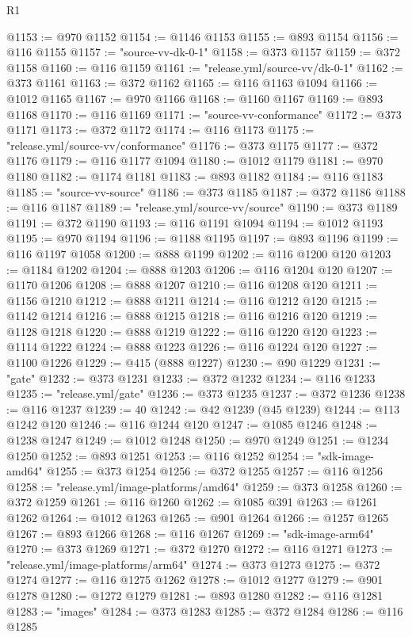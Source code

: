 \begin{lexlean}{R1}
\begin{coremodule}
@1153 := @970 @1152
@1154 := @1146 @1153
@1155 := @893 @1154
@1156 := @116 @1155
@1157 := "source-vv-dk-0-1"
@1158 := @373 @1157
@1159 := @372 @1158
@1160 := @116 @1159
@1161 := "release.yml/source-vv/dk-0-1"
@1162 := @373 @1161
@1163 := @372 @1162
@1165 := @116 @1163 @1094
@1166 := @1012 @1165
@1167 := @970 @1166
@1168 := @1160 @1167
@1169 := @893 @1168
@1170 := @116 @1169
@1171 := "source-vv-conformance"
@1172 := @373 @1171
@1173 := @372 @1172
@1174 := @116 @1173
@1175 := "release.yml/source-vv/conformance"
@1176 := @373 @1175
@1177 := @372 @1176
@1179 := @116 @1177 @1094
@1180 := @1012 @1179
@1181 := @970 @1180
@1182 := @1174 @1181
@1183 := @893 @1182
@1184 := @116 @1183
@1185 := "source-vv-source"
@1186 := @373 @1185
@1187 := @372 @1186
@1188 := @116 @1187
@1189 := "release.yml/source-vv/source"
@1190 := @373 @1189
@1191 := @372 @1190
@1193 := @116 @1191 @1094
@1194 := @1012 @1193
@1195 := @970 @1194
@1196 := @1188 @1195
@1197 := @893 @1196
@1199 := @116 @1197 @1058
@1200 := @888 @1199
@1202 := @116 @1200 @120
@1203 := @1184 @1202
@1204 := @888 @1203
@1206 := @116 @1204 @120
@1207 := @1170 @1206
@1208 := @888 @1207
@1210 := @116 @1208 @120
@1211 := @1156 @1210
@1212 := @888 @1211
@1214 := @116 @1212 @120
@1215 := @1142 @1214
@1216 := @888 @1215
@1218 := @116 @1216 @120
@1219 := @1128 @1218
@1220 := @888 @1219
@1222 := @116 @1220 @120
@1223 := @1114 @1222
@1224 := @888 @1223
@1226 := @116 @1224 @120
@1227 := @1100 @1226
@1229 := @415 (@888 @1227)
@1230 := @90 @1229
@1231 := "gate"
@1232 := @373 @1231
@1233 := @372 @1232
@1234 := @116 @1233
@1235 := "release.yml/gate"
@1236 := @373 @1235
@1237 := @372 @1236
@1238 := @116 @1237
@1239 := 40
@1242 := @42 @1239 (@45 @1239)
@1244 := @113 @1242 @120
@1246 := @116 @1244 @120
@1247 := @1085 @1246
@1248 := @1238 @1247
@1249 := @1012 @1248
@1250 := @970 @1249
@1251 := @1234 @1250
@1252 := @893 @1251
@1253 := @116 @1252
@1254 := "sdk-image-amd64"
@1255 := @373 @1254
@1256 := @372 @1255
@1257 := @116 @1256
@1258 := "release.yml/image-platforms/amd64"
@1259 := @373 @1258
@1260 := @372 @1259
@1261 := @116 @1260
@1262 := @1085 @391
@1263 := @1261 @1262
@1264 := @1012 @1263
@1265 := @901 @1264
@1266 := @1257 @1265
@1267 := @893 @1266
@1268 := @116 @1267
@1269 := "sdk-image-arm64"
@1270 := @373 @1269
@1271 := @372 @1270
@1272 := @116 @1271
@1273 := "release.yml/image-platforms/arm64"
@1274 := @373 @1273
@1275 := @372 @1274
@1277 := @116 @1275 @1262
@1278 := @1012 @1277
@1279 := @901 @1278
@1280 := @1272 @1279
@1281 := @893 @1280
@1282 := @116 @1281
@1283 := "images"
@1284 := @373 @1283
@1285 := @372 @1284
@1286 := @116 @1285

\end{coremodule}
\end{lexlean}
